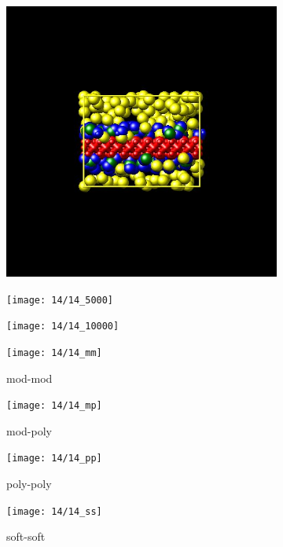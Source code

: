 \documentclass[a4paper]{article}
\begin{document}
\begin{figure}[H]
\begin{subfigure}{0.3\textwidth}
  \centering
  \includegraphics[width=\linewidth,keepaspectratio]{start}
  \caption{}
\end{subfigure}
\begin{subfigure}{0.3\textwidth}
  \centering
  \texttt{[image: 14/14\_5000]}
  \caption{}
\end{subfigure}
\begin{subfigure}{0.3\textwidth}
  \centering
  \texttt{[image: 14/14\_10000]}
  \caption{}
\end{subfigure}
\caption{}
\label{fig_1}
\end{figure}

\begin{figure}[H]
\begin{subfigure}{0.24\textwidth}
  \centering
  \texttt{[image: 14/14\_mm]}
  \caption{mod-mod}
\end{subfigure}
\begin{subfigure}{0.24\textwidth}
  \centering
  \texttt{[image: 14/14\_mp]}
  \caption{mod-poly}
\end{subfigure}
\begin{subfigure}{0.24\textwidth}
  \centering
  \texttt{[image: 14/14\_pp]}
  \caption{poly-poly}
\end{subfigure}
\begin{subfigure}{0.24\textwidth}
  \centering
  \texttt{[image: 14/14\_ss]}
  \caption{soft-soft}
\end{subfigure}
\caption{}
\label{fig_1}
\end{figure}
\end{document}
